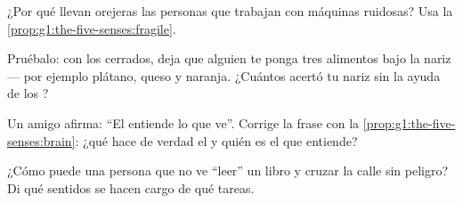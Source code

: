 \begin{exercise}[$\star$]\label{exo:g1:the-five-senses:7}
¿Por qué llevan orejeras las personas que trabajan con máquinas
ruidosas? Usa la \cref{prop:g1:the-five-senses:fragile}.
\end{exercise}

\begin{exercise}[$\star$]\label{exo:g1:the-five-senses:8}
Pruébalo: con los  cerrados, deja que alguien te ponga tres
alimentos bajo la nariz --- por ejemplo plátano, queso y naranja.
¿Cuántos acertó tu nariz sin la ayuda de los ?
\end{exercise}

\begin{exercise}[$\star\star$]\label{exo:g1:the-five-senses:9}
Un amigo afirma: ``El  entiende lo que ve''. Corrige la frase con
la \cref{prop:g1:the-five-senses:brain}: ¿qué hace de verdad el  y
quién es el que entiende?
\end{exercise}

\begin{exercise}[$\star\star$]\label{exo:g1:the-five-senses:10}
¿Cómo puede una persona que no ve ``leer'' un libro y cruzar la calle
sin peligro? Di qué sentidos se hacen cargo de qué tareas.
\end{exercise}
